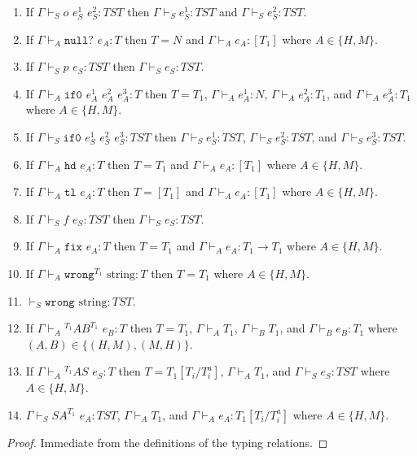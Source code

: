 \begin{lemma}
\begin{enumerate}
\item If $\Gamma\vdash_{S}o$ $e_{S}^{1}$ $e_{S}^{2}:TST$ then $\Gamma\vdash_{S}e_{S}^{1}:TST$ and $\Gamma\vdash_{S}e_{S}^{2}:TST$.
\item If $\Gamma\vdash_{A}\mathtt{null?}$ $e_{A}:T$ then $T=N$ and $\Gamma\vdash_{A}e_{A}:[T_{1}]$ where $A\in\lbrace H,M\rbrace$.
\item If $\Gamma\vdash_{S}p$ $e_{S}:TST$ then $\Gamma\vdash_{S}e_{S}:TST$.
\item If $\Gamma\vdash_{A}\mathtt{if0}$ $e_{A}^{1}$ $e_{A}^{2}$ $e_{A}^{3}:T$ then $T=T_{1}$, $\Gamma\vdash_{A}e_{A}^{1}:N$, $\Gamma\vdash_{A}e_{A}^{2}:T_{1}$, and $\Gamma\vdash_{A}e_{A}^{3}:T_{1}$ where $A\in\lbrace H,M\rbrace$.
\item If $\Gamma\vdash_{S}\mathtt{if0}$ $e_{S}^{1}$ $e_{S}^{2}$ $e_{S}^{3}:TST$ then $\Gamma\vdash_{S}e_{S}^{1}:TST$, $\Gamma\vdash_{S}e_{S}^{2}:TST$, and $\Gamma\vdash_{S}e_{S}^{3}:TST$.
\item If $\Gamma\vdash_{A}\mathtt{hd}$ $e_{A}:T$ then $T=T_{1}$ and $\Gamma\vdash_{A}e_{A}:[T_{1}]$ where $A\in\lbrace H,M\rbrace$.
\item If $\Gamma\vdash_{A}\mathtt{tl}$ $e_{A}:T$ then $T=[T_{1}]$ and $\Gamma\vdash_{A}e_{A}:[T_{1}]$ where $A\in\lbrace H,M\rbrace$.
\item If $\Gamma\vdash_{S}f$ $e_{S}:TST$ then $\Gamma\vdash_{S}e_{S}:TST$.
\item If $\Gamma\vdash_{A}\mathtt{fix}$ $e_{A}:T$ then $T=T_{1}$ and $\Gamma\vdash_{A}e_{A}:T_{1}\rightarrow T_{1}$ where $A\in\lbrace H,M\rbrace$.
\item If $\Gamma\vdash_{A}\mathtt{wrong}^{T_{1}}$ $\mathrm{string}:T$ then $T=T_{1}$ where $A\in\lbrace H,M\rbrace$.
\item $\vdash_{S}\mathtt{wrong}$ $\mathrm{string}:TST$.
\item If $\Gamma\vdash_{A}{^{T_{1}}A}B^{T_{1}}$ $e_{B}:T$ then $T=T_{1}$, $\Gamma\vdash_{A}T_{1}$, $\Gamma\vdash_{B}T_{1}$, and $\Gamma\vdash_{B}e_{B}:T_{1}$ where $(A,B)\in\lbrace(H,M),(M,H)\rbrace$.
\item If $\Gamma\vdash_{A}{^{T_{1}}A}S$ $e_{S}:T$ then $T=T_{1}[T_{i}/T_{i}^{a}]$, $\Gamma\vdash_{A}T_{1}$, and $\Gamma\vdash_{S}e_{S}:TST$ where $A\in\lbrace H,M\rbrace$.
\item $\Gamma\vdash_{S}SA^{T_{1}}$ $e_{A}:TST$, $\Gamma\vdash_{A}T_{1}$, and $\Gamma\vdash_{A}e_{A}:T_{1}[T_{i}/T_{i}^{a}]$ where $A\in\lbrace H,M\rbrace$.
\end{enumerate}
\begin{proof}
Immediate from the definitions of the typing relations.
\end{proof}
\end{lemma}